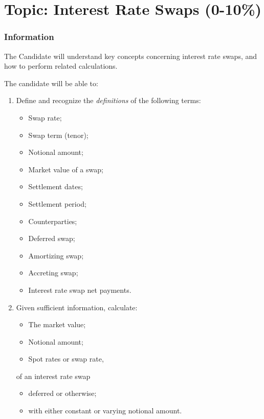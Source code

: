 \chapter[Topic: Interest Rate Swaps]{Topic: Interest Rate Swaps (0-10\%)}

\subsection{Information}

\begin{distributions}[Objective]
The Candidate will understand key concepts concerning interest rate swaps, and how to perform related calculations.
\end{distributions}

\begin{outcomes}
The candidate will be able to:
\begin{enumerate}[label = \alph*)]
	\item	Define and recognize the \textit{definitions} of the following terms:
		\begin{itemize}[leftmargin = *]
		\item	Swap rate;
		\item	Swap term (tenor);
		\item	Notional amount;
		\item	Market value of a swap;
		\item	Settlement dates;
		\item	Settlement period;
		\item	Counterparties;
		\item	Deferred swap;
		\item	Amortizing swap;
		\item	Accreting swap;
		\item	Interest rate swap net payments.
		\end{itemize}
	\item	Given sufficient information, calculate: 
		\begin{itemize}[leftmargin = *]
		\item	The market value;
		\item	Notional amount;
		\item	Spot rates or swap rate,
		\end{itemize}
		of an interest rate swap
		\begin{itemize}[leftmargin = *]
		\item	deferred or otherwise;
		\item	with either constant or varying notional amount.
		\end{itemize}
\end{enumerate}
\end{outcomes}

